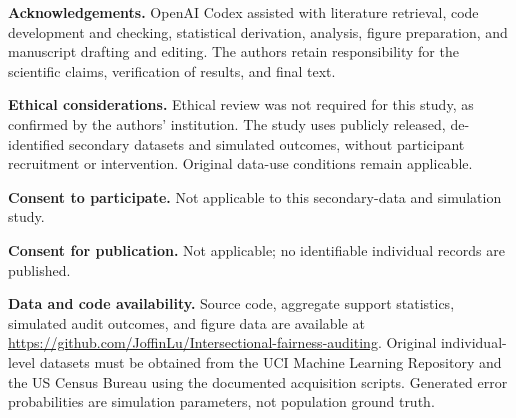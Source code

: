 \documentclass[11pt,a4paper]{article}
\begin{document}
\textbf{Acknowledgements.} OpenAI Codex assisted with literature retrieval, code development and checking, statistical derivation, analysis, figure preparation, and manuscript drafting and editing. The authors retain responsibility for the scientific claims, verification of results, and final text.

\textbf{Ethical considerations.} Ethical review was not required for this study, as confirmed by the authors' institution. The study uses publicly released, de-identified secondary datasets and simulated outcomes, without participant recruitment or intervention. Original data-use conditions remain applicable.

\textbf{Consent to participate.} Not applicable to this secondary-data and simulation study.

\textbf{Consent for publication.} Not applicable; no identifiable individual records are published.

\textbf{Data and code availability.} Source code, aggregate support statistics, simulated audit outcomes, and figure data are available at \url{https://github.com/JoffinLu/Intersectional-fairness-auditing}. Original individual-level datasets must be obtained from the UCI Machine Learning Repository and the US Census Bureau using the documented acquisition scripts. Generated error probabilities are simulation parameters, not population ground truth.
\end{document}
